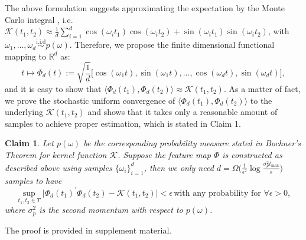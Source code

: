 \documentclass{article} %
\newcommand{\Kcal}{\mathcal{K}}
\newtheorem{claim}{Claim}
\begin{document}
The above formulation suggests approximating the expectation by the Monte Carlo integral \citep{rahimi2008random}, i.e. $\mathcal{K}(t_1,t_2) \approx \frac{1}{d}\sum_{i=1}^d\cos(\omega_i t_1)\cos(\omega_i t_2) + \sin(\omega_i t_1)\sin(\omega_i t_2)$, with $\omega_1,\ldots,\omega_d \stackrel{\text{i.i.d}}{\sim} p(\omega)$.
Therefore, we propose the finite dimensional functional mapping to $\mathbb{R}^d$ as: 
\begin{equation}
t \mapsto \Phi_d(t) := \sqrt{\frac{1}{d}}\big[\cos(\omega_1 t),\sin(\omega_1 t),\ldots,\cos(\omega_d t), \sin(\omega_d t)\big],
\end{equation} 
and it is easy to show that $\big\langle \Phi_d(t_1), \Phi_d(t_2) \big\rangle \approx \Kcal (t_1,t_2)$. As a matter of fact, we prove the stochastic uniform convergence of $\big\langle \Phi_d(t_1), \Phi_d(t_2) \big\rangle$ to the underlying $\Kcal (t_1,t_2)$ and shows that it takes only a reasonable amount of samples to achieve proper estimation, which is stated in Claim 1.
\begin{claim}
Let $p(\omega)$ be the corresponding probability measure stated in Bochner's Theorem for kernel function $\mathcal{K}$. Suppose the feature map $\Phi$ is constructed as described above using samples $\{\omega_i\}_{i=1}^d$, then we only need $d=\Omega \big(\frac{1}{\epsilon^2} \log \frac{\sigma_p^2 t_{\max}}{\epsilon}\big)$ samples to have
\begin{equation*}
    \sup_{t_1,t_2 \in T}\big|\Phi_d(t_1)^{'} \Phi_d(t_2) - \mathcal{K}(t_1,t_2)\big| < \epsilon \, \text{with any probability for }\forall \epsilon > 0,
\end{equation*}
where $\sigma_p^2$ is the second momentum with respect to $p(\omega)$.
\end{claim}
The proof is provided in supplement material. 
\end{document}
